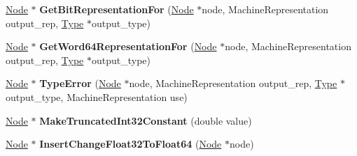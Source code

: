 \begin{DoxyCompactItemize}
\item 
\hyperlink{classv8_1_1internal_1_1compiler_1_1_node}{Node} $\ast$ {\bfseries Get\+Bit\+Representation\+For} (\hyperlink{classv8_1_1internal_1_1compiler_1_1_node}{Node} $\ast$node, Machine\+Representation output\+\_\+rep, \hyperlink{classv8_1_1internal_1_1_type}{Type} $\ast$output\+\_\+type)\hypertarget{classv8_1_1internal_1_1compiler_1_1_representation_changer_a90e4c31b12196c8f0d9c658684e8c325}{}\label{classv8_1_1internal_1_1compiler_1_1_representation_changer_a90e4c31b12196c8f0d9c658684e8c325}

\item 
\hyperlink{classv8_1_1internal_1_1compiler_1_1_node}{Node} $\ast$ {\bfseries Get\+Word64\+Representation\+For} (\hyperlink{classv8_1_1internal_1_1compiler_1_1_node}{Node} $\ast$node, Machine\+Representation output\+\_\+rep, \hyperlink{classv8_1_1internal_1_1_type}{Type} $\ast$output\+\_\+type)\hypertarget{classv8_1_1internal_1_1compiler_1_1_representation_changer_a3f46054cecd83a7b2b186e4ee2101eae}{}\label{classv8_1_1internal_1_1compiler_1_1_representation_changer_a3f46054cecd83a7b2b186e4ee2101eae}

\item 
\hyperlink{classv8_1_1internal_1_1compiler_1_1_node}{Node} $\ast$ {\bfseries Type\+Error} (\hyperlink{classv8_1_1internal_1_1compiler_1_1_node}{Node} $\ast$node, Machine\+Representation output\+\_\+rep, \hyperlink{classv8_1_1internal_1_1_type}{Type} $\ast$output\+\_\+type, Machine\+Representation use)\hypertarget{classv8_1_1internal_1_1compiler_1_1_representation_changer_aae71a3d7a32018f7c3dd811613c144bd}{}\label{classv8_1_1internal_1_1compiler_1_1_representation_changer_aae71a3d7a32018f7c3dd811613c144bd}

\item 
\hyperlink{classv8_1_1internal_1_1compiler_1_1_node}{Node} $\ast$ {\bfseries Make\+Truncated\+Int32\+Constant} (double value)\hypertarget{classv8_1_1internal_1_1compiler_1_1_representation_changer_a54411606e6cfe4d363f49c72c48d6d1a}{}\label{classv8_1_1internal_1_1compiler_1_1_representation_changer_a54411606e6cfe4d363f49c72c48d6d1a}

\item 
\hyperlink{classv8_1_1internal_1_1compiler_1_1_node}{Node} $\ast$ {\bfseries Insert\+Change\+Float32\+To\+Float64} (\hyperlink{classv8_1_1internal_1_1compiler_1_1_node}{Node} $\ast$node)\hypertarget{classv8_1_1internal_1_1compiler_1_1_representation_changer_a3be2cb0800bc270ce08701062abe4e8d}{}\label{classv8_1_1internal_1_1compiler_1_1_representation_changer_a3be2cb0800bc270ce08701062abe4e8d}


\end{DoxyCompactItemize}
